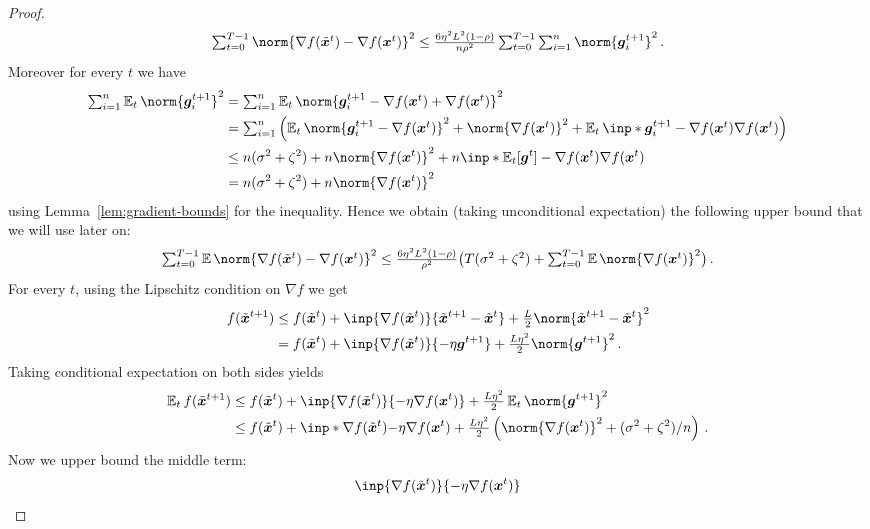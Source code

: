 \documentclass{article}
\begin{document}
\begin{proof}
  \[
    \tsum_{t=0}^{T-1} \norm{\nabla f(\tilde \xx^t) - \nabla f(\xx^t)}^2
    \leq
    \tfrac{6 \eta^2 L^2 (1-\rho)}{n \rho^2} \tsum_{t=0}^{T-1} \tsum_{i=1}^n \norm{\gg_i^{t+1}}^2
    \, .
  \]
  Moreover for every $t$ we have
  \begin{align*}
    \tsum_{i=1}^n \E_t \norm{\gg_i^{t+1}}^2
     & =
    \tsum_{i=1}^n \E_t \norm{\gg_i^{t+1} - \nabla f(\xx^t) + \nabla f(\xx^t)}^2 
    \\
     & =
    \tsum_{i=1}^n \left( \E_t \norm{\gg_i^{t+1} - \nabla f(\xx^t)}^2  + \norm{\nabla f(\xx^t)}^2 + \E_t \inp*{\gg_i^{t+1} - \nabla f(\xx^t)}{\nabla f(\xx^t)} \right)
    \\
     & \leq
    n (\sigma^2+\zeta^2) + n \norm{\nabla f(\xx^t)}^2 + n \inp*{\E_t [\gg^t]  - \nabla f(\xx^t)}{\nabla f(\xx^t)}
    \\
     & =
    n (\sigma^2+\zeta^2) + n \norm{\nabla f(\xx^t)}^2
  \end{align*}
  using Lemma~\ref{lem:gradient-bounds} for the inequality.
  Hence we obtain (taking unconditional expectation) the following upper bound that we will use later on:
  \[
    \tsum_{t=0}^{T-1} \E \norm{\nabla f(\tilde \xx^t) - \nabla f(\xx^t)}^2
    \leq
    \tfrac{6 \eta^2 L^2 (1-\rho)}{\rho^2} \bigl( T (\sigma^2+\zeta^2) + \tsum_{t=0}^{T-1} \E \norm{\nabla f(\xx^t)}^2 \bigr)
    \, .
  \]
  For every $t$, using the Lipschitz condition on $\nabla f$ we get
  \begin{align*}
    f(\tilde \xx^{t+1})
     & \leq
    f(\tilde \xx^t) + \inp{\nabla f(\tilde \xx^t)}{\tilde \xx^{t+1} - \tilde \xx^t} + \tfrac{L}{2} \norm{\tilde \xx^{t+1} - \tilde \xx^t}^2
    \\
     & =
    f(\tilde \xx^t) + \inp{\nabla f(\tilde \xx^t)}{-\eta \gg^{t+1}} + \tfrac{L \eta^2}{2} \norm{\gg^{t+1}}^2
    \, .
  \end{align*}
  Taking conditional expectation on both sides yields
  \begin{align*}
    \E_t f(\tilde \xx^{t+1}) 
     & \leq
    f(\tilde \xx^t) + \inp{\nabla f(\tilde \xx^t)}{-\eta \nabla f(\xx^t)} + \tfrac{L \eta^2}{2} \E_t \norm{\gg^{t+1}}^2
    \\
     & \leq
    f(\tilde \xx^t) + \inp*{\nabla f(\tilde \xx^t)}{-\eta \nabla f(\xx^t)} + \tfrac{L \eta^2}{2} \left( \norm{\nabla f(\xx^t)}^2  + (\sigma^2+\zeta^2)/n\right)
    \, .
  \end{align*}
  Now we upper bound the middle term:
  \begin{align*}
    \inp{\nabla f(\tilde \xx^t)}{-\eta \nabla f(\xx^t)}

\end{align*}
\end{proof}
\end{document}
